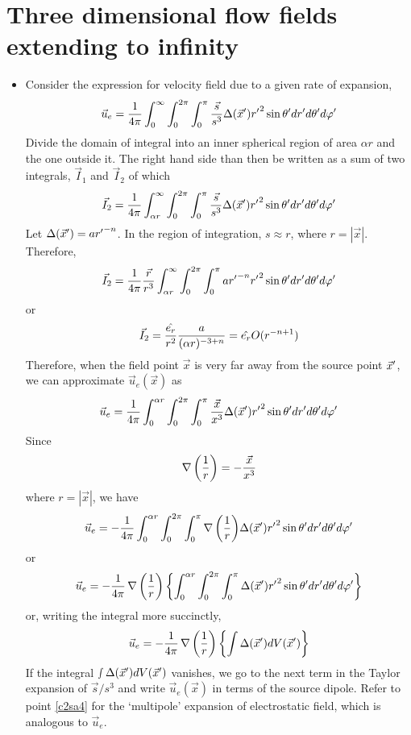 \section{Three dimensional flow fields extending to infinity}\label{c2s9}
\begin{itemize}
\item Consider the expression for velocity field due to a given rate of expansion,
\[
\vec{u}_e = \frac{1}{4\pi}\int_0^\infty\int_0^{2\pi}\int_0^\pi \frac{\vec{s}}{s^3}\Delta(\vec{x}^\prime){r^\prime}^2\sin\theta^\prime dr^\prime d\theta^\prime d\varphi^\prime
\]
Divide the domain of integral into an inner spherical region of area $\alpha r$ and the one outside it. The right hand side than then be written as a sum of two integrals, $\vec{I}_1$ and
$\vec{I}_2$ of which
\[
\vec{I}_2 = \frac{1}{4\pi}\int_{\alpha r}^\infty\int_0^{2\pi}\int_0^\pi \frac{\vec{s}}{s^3}\Delta(\vec{x}^\prime){r^\prime}^2\sin\theta^\prime dr^\prime d\theta^\prime d\varphi^\prime
\]
Let $\Delta(\vec{x}^\prime) = a{r^\prime}^{-n}$. In the region of integration, $s \approx r$, where $r = |\vec{x}|$.  Therefore,
\[
\vec{I}_2 = \frac{1}{4\pi}\frac{\vec{r}}{r^3}\int_{\alpha r}^\infty\int_0^{2\pi}\int_0^\pi a{r^\prime}^{-n} {r^\prime}^2\sin\theta^\prime dr^\prime d\theta^\prime d\varphi^\prime
\]
or
\[
\vec{I}_2 = \frac{\hat{e_{r}}}{r^2}\frac{a}{(\alpha r)^{-3 + n}} = \hat{e_{r}} O(r^{-n + 1})
\]
Therefore, when the field point $\vec{x}$ is very far away from the source point $\vec{x}^\prime$, we can approximate $\vec{u}_e(\vec{x})$ as
\[
\vec{u}_e = \frac{1}{4\pi}\int_0^{\alpha r}\int_0^{2\pi}\int_0^\pi \frac{\vec{x}}{x^3}\Delta(\vec{x}^\prime){r^\prime}^2\sin\theta^\prime dr^\prime d\theta^\prime d\varphi^\prime
\]
Since 
\[
\operatorname{\nabla}{\left(\frac{1}{r}\right)} = -\frac{\vec{x}}{x^3}
\]
where $r = |\vec{x}|$, we have
\[
\vec{u}_e = -\frac{1}{4\pi}\int_0^{\alpha r}\int_0^{2\pi}\int_0^\pi \operatorname{\nabla}{\left(\frac{1}{r}\right)} \Delta(\vec{x}^\prime){r^\prime}^2\sin\theta^\prime dr^\prime d\theta^\prime d\varphi^\prime
\]
or
\[
\vec{u}_e = 
-\frac{1}{4\pi}\operatorname{\nabla}{\left(\frac{1}{r}\right)}\left\{\int_0^{\alpha r}\int_0^{2\pi}\int_0^\pi \Delta(\vec{x}^\prime){r^\prime}^2\sin\theta^\prime dr^\prime d\theta^\prime d\varphi^\prime\right\}
\]
or, writing the integral more succinctly,
\[
\vec{u}_e = -\frac{1}{4\pi}\operatorname{\nabla}{\left(\frac{1}{r}\right)}\left\{\int \Delta(\vec{x}^\prime)dV(\vec{x}^\prime)\right\}
\]
If the integral $\smallint \Delta(\vec{x}^\prime)dV(\vec{x}^\prime)$ vanishes, we go to the next term in the Taylor expansion of $\vec{s}/s^3$ and write $\vec{u}_e(\vec{x})$ in terms of
the source dipole. Refer to point \ref{c2sa4} for the \enquote*{multipole} expansion of electrostatic field, which is analogous to $\vec{u}_e$.


\end{itemize}
